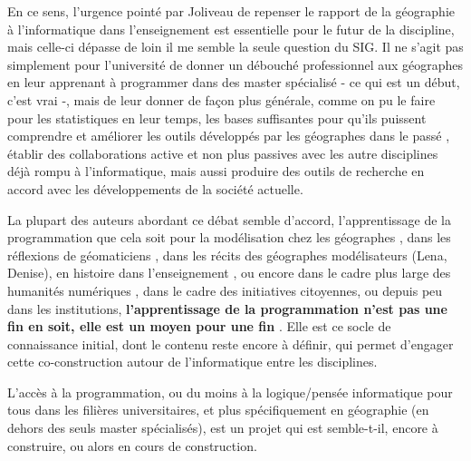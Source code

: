 
En ce sens, l'urgence pointé par Joliveau de repenser le rapport de la géographie à l'informatique dans l'enseignement est essentielle pour le futur de la discipline, mais celle-ci dépasse de loin il me semble la seule question du SIG. Il ne s'agit pas simplement pour l'université de donner un débouché professionnel aux géographes en leur apprenant à programmer dans des master spécialisé - ce qui est un début, c'est vrai -, mais de leur donner de façon plus générale, comme on pu le faire pour les statistiques en leur temps, les bases suffisantes pour qu'ils puissent comprendre et améliorer les outils développés par les géographes dans le passé , établir des collaborations active et non plus passives avec les autre disciplines déjà rompu à l'informatique, mais aussi produire des outils de recherche en accord avec les développements de la société actuelle.

La plupart des auteurs abordant ce débat semble d'accord, l'apprentissage de la programmation que cela soit pour la modélisation chez les géographes \autocite[64]{Banos2013}, dans les réflexions de géomaticiens \autocite{Joliveau2004}, dans les récits des géographes modélisateurs (Lena, Denise), en histoire dans l'enseignement \autocite{Genet1993}, ou encore dans le cadre plus large des humanités numériques , dans le cadre des initiatives citoyennes, ou depuis peu dans les institutions, \textbf{l'apprentissage de la programmation n'est pas une fin en soit, elle est un moyen pour une fin} \textcite[67]{Plantin2014}. Elle est ce socle de connaissance initial, dont le contenu reste encore à définir, qui permet d'engager cette co-construction autour de l'informatique entre les disciplines.

L'accès à la programmation, ou du moins à la logique/pensée informatique pour tous dans les filières universitaires, et plus spécifiquement en géographie (en dehors des seuls master spécialisés), est un projet qui est semble-t-il, encore à construire, ou alors en cours de construction.



